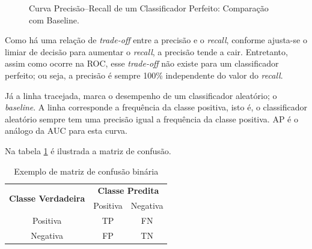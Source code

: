 \pgfplotsset{compat=1.18}

\begin{figure}[H]
    \centering
    \caption{Curva Precisão–Recall de um Classificador Perfeito: Comparação com Baseline.}
    
    \label{fig:pr_curve_perfect}
\end{figure}

Como há uma relação de \textit{trade-off} entre a precisão e o \textit{recall}, conforme ajusta-se o limiar de decisão para aumentar o \textit{recall},
a precisão tende a cair. Entretanto, assim como ocorre na ROC, esse \textit{trade-off} não existe para um classificador perfeito; ou seja, a precisão é 
sempre 100\% independente do valor do \textit{recall}.

Já a linha tracejada, marca o desempenho de um classificador aleatório; o \textit{baseline}. A linha corresponde a frequência da classe positiva, isto é, 
o classificador aleatório sempre tem uma precisão igual a frequência da classe positiva. AP é o análogo da AUC para esta curva.

Na tabela \ref{tab:matriz_confusao} é ilustrada a matriz de confusão.

\begin{table}[H]
\centering
\caption{Exemplo de matriz de confusão binária}
\label{tab:matriz_confusao}
\begin{tabular}{|c|c|c|}
\hline
\multirow{2}{*}{\textbf{Classe Verdadeira}} & \multicolumn{2}{c|}{\textbf{Classe Predita}} \\ \cline{2-3} 
 & Positiva & Negativa \\ \hline
Positiva & TP & FN \\ \hline
Negativa & FP & TN \\ \hline
\end{tabular}
\end{table}

